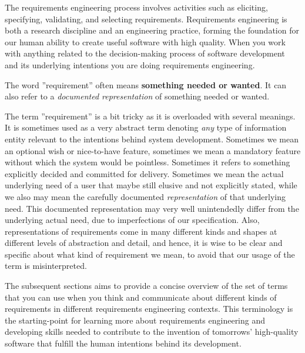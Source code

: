 %
%
The requirements engineering process involves activities such as eliciting, specifying, validating, and selecting requirements. 
Requirements engineering is both a research discipline and an engineering practice, forming the foundation for our human ability to create useful software with high quality. When you work with anything related to the decision-making process of software development and its underlying intentions you are doing requirements engineering.



The word ''requirement'' often means \textbf{something needed or wanted}. It can also refer to a \emph{documented representation} of something needed or wanted. 

The term ''requirement'' is a bit tricky as it is overloaded with several meanings. It is sometimes used as a very abstract term denoting \textit{any} type of information entity relevant to the intentions behind system development.  Sometimes we mean an optional wish or nice-to-have feature, sometimes we mean a mandatory feature without which the system would be pointless. Sometimes it refers to something explicitly decided and committed for delivery. Sometimes we mean the actual underlying need of a user that maybe still elusive and not explicitly stated, while we also may mean the carefully documented \textit{representation} of that underlying need. This documented representation may very well unintendedly differ from the underlying actual need, due to imperfections of our specification. 
Also, representations of requirements come in many different kinds and shapes at different levels of abstraction and detail, and hence, it is wise to be clear and specific about what kind of requirement we mean, to avoid that our usage of the term is misinterpreted. 


The subsequent sections aims to provide a concise overview of the set of terms that you can use when you think and communicate about different kinds of requirements in different requirements engineering contexts. This terminology is the starting-point for learning more about requirements engineering and developing skills needed to contribute to the invention of tomorrows' high-quality software that fulfill the human intentions behind its development.

